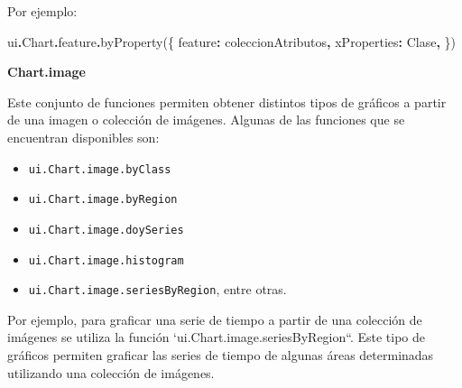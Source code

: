 \documentclass[
  12pt,
  letterpaper,
  twoside]{book}
\newenvironment{Shaded}{\begin{snugshade}}{\end{snugshade}}
\newcommand{\AttributeTok}[1]{\textcolor[rgb]{0.77,0.63,0.00}{#1}}
\newcommand{\DataTypeTok}[1]{\textcolor[rgb]{0.13,0.29,0.53}{#1}}
\newcommand{\FunctionTok}[1]{\textcolor[rgb]{0.00,0.00,0.00}{#1}}
\newcommand{\NormalTok}[1]{#1}
\newcommand{\OperatorTok}[1]{\textcolor[rgb]{0.81,0.36,0.00}{\textbf{#1}}}
\newcommand{\StringTok}[1]{\textcolor[rgb]{0.31,0.60,0.02}{#1}}
\providecommand{\tightlist}{%
  \setlength{\itemsep}{0pt}\setlength{\parskip}{0pt}}
\begin{document}
Por ejemplo:

\begin{Shaded}
\begin{Highlighting}[]
\NormalTok{ui}\OperatorTok{.}\AttributeTok{Chart}\OperatorTok{.}\AttributeTok{feature}\OperatorTok{.}\FunctionTok{byProperty}\NormalTok{(\{}
  \DataTypeTok{feature}\OperatorTok{:}\NormalTok{ coleccionAtributos}\OperatorTok{,} 
  \DataTypeTok{xProperties}\OperatorTok{:} \StringTok{\textquotesingle{}Clase\textquotesingle{}}\OperatorTok{,}
\NormalTok{\})}
\end{Highlighting}
\end{Shaded}

\textbf{Chart.image}

Este conjunto de funciones permiten obtener distintos tipos de gráficos a partir de una imagen o colección de imágenes. Algunas de las funciones que se encuentran disponibles son:

\begin{itemize}
\tightlist
\item
  \texttt{ui.Chart.image.byClass}
\item
  \texttt{ui.Chart.image.byRegion}
\item
  \texttt{ui.Chart.image.doySeries}
\item
  \texttt{ui.Chart.image.histogram}
\item
  \texttt{ui.Chart.image.seriesByRegion}, entre otras.
\end{itemize}

Por ejemplo, para graficar una serie de tiempo a partir de una colección de imágenes se utiliza la función `ui.Chart.image.seriesByRegion``. Este tipo de gráficos permiten graficar las series de tiempo de algunas áreas determinadas utilizando una colección de imágenes.
\end{document}
